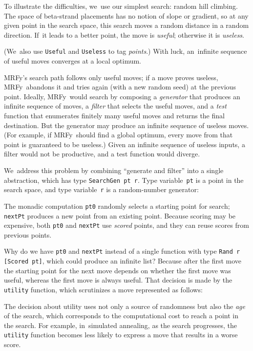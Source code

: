 \documentclass[nonatbib]{sigplanconf}
\newcommand\mrfy{MRFy} %
\newcommand\smallverbatiminput[1]{{\par\unskip\small}}
\begin{document}
To illustrate the difficulties, we~use our simplest search:
random hill climbing.
The space of beta-strand placements has no notion of slope or
gradient,
so at any given point in the search space, this search moves a random
distance in a random 
direction.
If~it leads to a better point, the move
is \emph{useful};
otherwise it is \emph{useless}.
\smallverbatiminput{utility}
(We~also use \texttt{Useful} and \texttt{Useless} to tag \emph{points}.)
With luck, an~infinite sequence of useful moves converges
at a local optimum.

\mrfy's search path follows only useful moves;
if a move proves useless, 
\mrfy\ abandons it and tries again (with a new random seed) at the
previous point.
Ideally, \mrfy\ would search by composing a \emph{generator}
that produces an infinite sequence of moves, 
a \emph{filter} that selects the useful moves, and 
a \emph{test} function that enumerates finitely many useful moves
and returns the final destination.
But the generator may produce an infinite sequence of useless moves.
(For example, if \mrfy\ should find a global optimum, every move from
that point is guaranteed to be useless.)
Given an infinite sequence of useless inputs, a filter would not be
productive, and a test function would diverge.

We~address this problem by combining ``generate and filter'' into a
single abstraction, which has type \texttt{SearchGen pt r}.
Type variable~\texttt{pt} is a point in the search
space, and type variable~\texttt{r} is a
random-number generator:
\smallverbatiminput{gen.tex}
The monadic computation \texttt{pt0} randomly selects a starting point
for search;
\texttt{nextPt} produces a new point from
an existing point.
Because scoring may be expensive, both \texttt{pt0}
and \texttt{nextPt} use \emph{scored} points, and they can
reuse scores from previous points.

Why do we have \texttt{pt0} and \texttt{nextPt}
instead 
of a single function with type \mbox{\texttt{Rand r [Scored pt]}},
which could produce an infinite list?
Because after the first move
the starting point for the next move depends on whether the first move
was useful, whereas the first move is always useful.
That decision is made by the \texttt{utility} function,
which scrutinizes a move represented as follows:
\smallverbatiminput{move}
The decision about utility uses not only a source of randomness but
also the \emph{age} of the search, which corresponds to the
computational cost to reach a point in the search.
For example, in~simulated annealing, as the search progresses,
the \texttt{utility} function becomes less likely to express a move
that results in a worse score.
\end{document}
